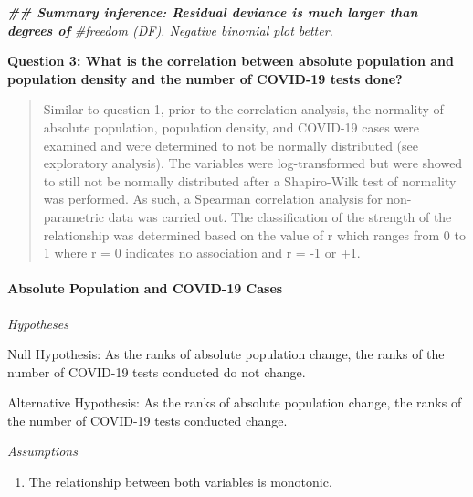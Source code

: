 \documentclass[
  12pt,
]{article}
\newenvironment{Shaded}{\begin{snugshade}}{\end{snugshade}}
\newcommand{\AttributeTok}[1]{\textcolor[rgb]{0.77,0.63,0.00}{#1}}
\newcommand{\CommentTok}[1]{\textcolor[rgb]{0.56,0.35,0.01}{\textit{#1}}}
\newcommand{\DocumentationTok}[1]{\textcolor[rgb]{0.56,0.35,0.01}{\textbf{\textit{#1}}}}
\newcommand{\FunctionTok}[1]{\textcolor[rgb]{0.00,0.00,0.00}{#1}}
\newcommand{\NormalTok}[1]{#1}
\newcommand{\OtherTok}[1]{\textcolor[rgb]{0.56,0.35,0.01}{#1}}
\newcommand{\SpecialCharTok}[1]{\textcolor[rgb]{0.00,0.00,0.00}{#1}}
\newcommand{\StringTok}[1]{\textcolor[rgb]{0.31,0.60,0.02}{#1}}
\providecommand{\tightlist}{%
  \setlength{\itemsep}{0pt}\setlength{\parskip}{0pt}}
\begin{document}
\begin{Shaded}
\begin{Highlighting}[]
\DocumentationTok{\#\# Summary inference: Residual deviance is much larger than degrees of}
\CommentTok{\#freedom (DF). Negative binomial plot better.}
\end{Highlighting}
\end{Shaded}

\textbf{Question 3: What is the correlation between absolute population
and population density and the number of COVID-19 tests done?}

\begin{quote}
Similar to question 1, prior to the correlation analysis, the normality
of absolute population, population density, and COVID-19 cases were
examined and were determined to not be normally distributed (see
exploratory analysis). The variables were log-transformed but were
showed to still not be normally distributed after a Shapiro-Wilk test of
normality was performed. As such, a Spearman correlation analysis for
non-parametric data was carried out. The classification of the strength
of the relationship was determined based on the value of r which ranges
from 0 to 1 where r = 0 indicates no association and r = -1 or +1.
\end{quote}

\hypertarget{absolute-population-and-covid-19-cases-1}{%
\paragraph{Absolute Population and COVID-19
Cases}\label{absolute-population-and-covid-19-cases-1}}

\emph{Hypotheses}

Null Hypothesis: As the ranks of absolute population change, the ranks
of the number of COVID-19 tests conducted do not change.

Alternative Hypothesis: As the ranks of absolute population change, the
ranks of the number of COVID-19 tests conducted change.

\emph{Assumptions}

\begin{enumerate}
\def\labelenumi{\arabic{enumi}.}
\tightlist
\item
  The relationship between both variables is monotonic.
\end{enumerate}

\begin{Shaded}
\end{Shaded}
\end{document}
